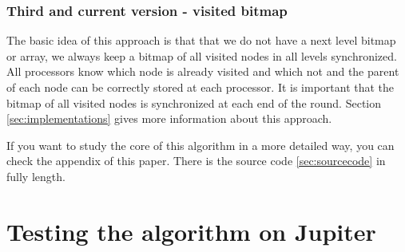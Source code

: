 \documentclass[12pt,a4paper]{article}
\begin{document}
\subsubsection{Third and current version - visited bitmap}

The basic idea of this approach is that that we do not have a next level bitmap or array, we always keep a bitmap of all visited nodes in all levels synchronized. All processors know which node is already visited and which not and the parent of each node can be correctly stored at each processor. It is important that the bitmap of all visited nodes is synchronized at each end of the round. Section \ref{sec:implementations} gives more information about this approach.

If you want to study the core of this algorithm in a more detailed way, you can check the appendix of this paper. There is the source code \ref{sec:sourcecode} in fully length.



\section{Testing the algorithm on Jupiter}
\label{sec:testing}
\end{document}
